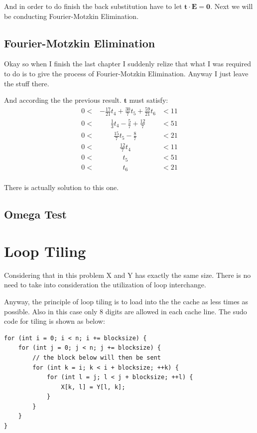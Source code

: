 \documentclass[12pt]{article}
\begin{document}
And in order to do finish the back substitution have to let
$\pmb{t\cdot E = 0}$. Next we will be conducting Fourier-Motzkin
Elimination.

\subsection{Fourier-Motzkin Elimination}
Okay so when I finish the last chapter I suddenly relize that what I
was required to do is to give the process of Fourier-Motzkin
Elimination. Anyway I just leave the stuff there.

And according the the previous result. $\pmb{t}$ must satisfy:
\begin{equation}
  \begin{aligned}
    0 <& -\frac{17}{21}t_4 + \frac{30}{7}t_5 + \frac{59}{21}t_6 &< 11 \\
    0 <& ~~~~~~~\frac{1}{3}t_4 - \frac{5}{7} + \frac{12}{7} &< 51 \\
0 <&~~~~~~~~~\frac{15}{7}t_5 - \frac{8}{7}  &< 21 \\
0 <& ~~~~~~~~~~~~~\frac{12}{7}t_4   &<  11 \\
0 <& ~~~~~~~~~~~~~~~t_5 &< 51 \\
0 <& ~~~~~~~~~~~~~~~ t_6 &< 21 \\
  \end{aligned}
\end{equation}

There is actually solution to this one.





\subsection{Omega Test}



\section{Loop Tiling}

Considering that in this problem X and Y has exactly the same size. There is no need to take into consideration
the utilization of loop interchange.

Anyway, the principle of loop tiling is to load  into the
the cache as less times  as possible. Also in this case only 8 digits
are allowed in each cache line. The sudo code for tiling is shown as
below:

\begin{verbatim}
for (int i = 0; i < n; i += blocksize) {
    for (int j = 0; j < n; j += blocksize) {
        // the block below will then be sent
        for (int k = i; k < i + blocksize; ++k) {
            for (int l = j; l < j + blocksize; ++l) {
                X[k, l] = Y[l, k];
            }
        }
    }
}
\end{verbatim}
\end{document}
